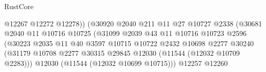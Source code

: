\begin{lexlean}{RustCore}
\begin{coremodule}
                                                  @12267
                                                  @12272
                                                  @12278))
                                              (@30920
                                                @2040
                                                @211
                                                @11
                                                @27
                                                @10727
                                                @2338
                                                (@30681
                                                  @2040
                                                  @11
                                                  @10716
                                                  @10725
                                                  (@31099
                                                    @2039
                                                    @43
                                                    @11
                                                    @10716
                                                    @10723
                                                    @2596
                                                    (@30223
                                                      @2035
                                                      @11
                                                      @40
                                                      @3597
                                                      @10715
                                                      @10722
                                                      @2432
                                                      @10698
                                                      @2277
                                                      @30240
                                                      (@31179
                                                        @10708
                                                        @2277
                                                        @30315
                                                        @29845
                                                        @12030
                                                        (@11544 (@12032 @10709 @2283)))
                                                      @12030
                                                      (@11544 (@12032 @10699 @10715)))
                                                    @12257
                                                    @12260

\end{coremodule}
\end{lexlean}
